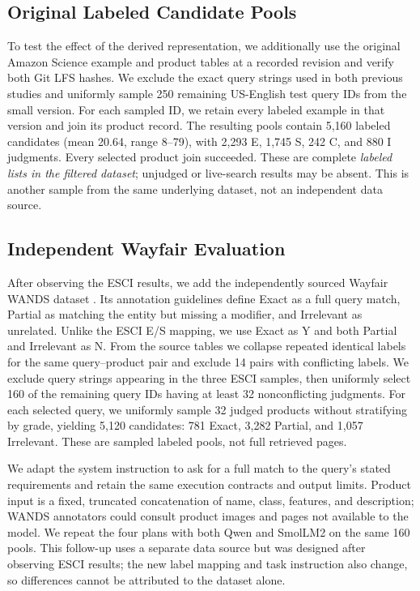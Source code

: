 \documentclass[conference]{IEEEtran}
\begin{document}
\subsection{Original Labeled Candidate Pools}
To test the effect of the derived representation, we additionally use the original Amazon Science example and product tables at a recorded revision and verify both Git LFS hashes. We exclude the exact query strings used in both previous studies and uniformly sample 250 remaining US-English test query IDs from the small version. For each sampled ID, we retain every labeled example in that version and join its product record. The resulting pools contain 5,160 labeled candidates (mean 20.64, range 8--79), with 2,293 E, 1,745 S, 242 C, and 880 I judgments. Every selected product join succeeded. These are complete \emph{labeled lists in the filtered dataset}; unjudged or live-search results may be absent. This is another sample from the same underlying dataset, not an independent data source.

\subsection{Independent Wayfair Evaluation}
After observing the ESCI results, we add the independently sourced Wayfair WANDS dataset \cite{wands}. Its annotation guidelines define Exact as a full query match, Partial as matching the entity but missing a modifier, and Irrelevant as unrelated. Unlike the ESCI E/S mapping, we use Exact as Y and both Partial and Irrelevant as N. From the source tables we collapse repeated identical labels for the same query--product pair and exclude 14 pairs with conflicting labels. We exclude query strings appearing in the three ESCI samples, then uniformly select 160 of the remaining query IDs having at least 32 nonconflicting judgments. For each selected query, we uniformly sample 32 judged products without stratifying by grade, yielding 5,120 candidates: 781 Exact, 3,282 Partial, and 1,057 Irrelevant. These are sampled labeled pools, not full retrieved pages.

We adapt the system instruction to ask for a full match to the query's stated requirements and retain the same execution contracts and output limits. Product input is a fixed, truncated concatenation of name, class, features, and description; WANDS annotators could consult product images and pages not available to the model. We repeat the four plans with both Qwen and SmolLM2 on the same 160 pools. This follow-up uses a separate data source but was designed after observing ESCI results; the new label mapping and task instruction also change, so differences cannot be attributed to the dataset alone.
\end{document}

